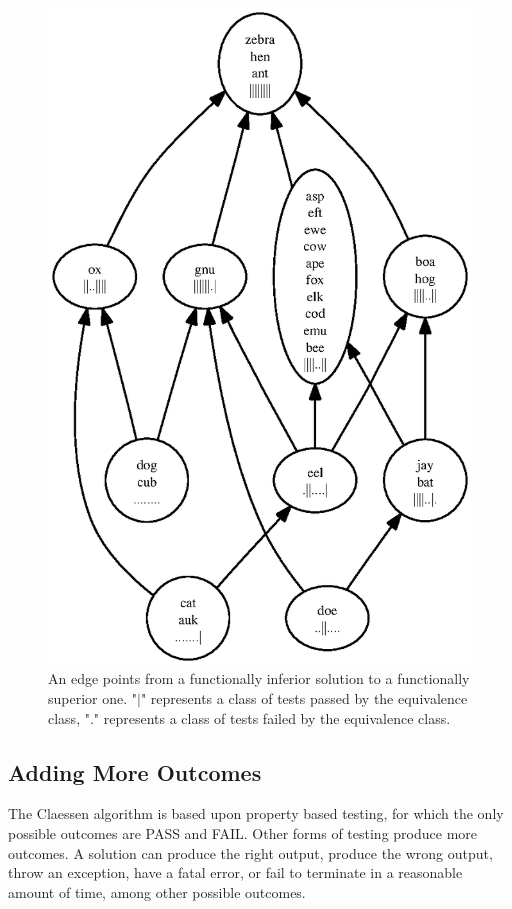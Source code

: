 \documentclass[11pt,twoside]{article}
\begin{document}
\begin{figure}
\centering
\includegraphics{rank1.ps}
\caption{An edge points from a functionally inferior solution to a functionally superior one. "$\vert$" represents a class of tests passed by the equivalence class, "." represents a class of tests failed by the equivalence class.}
\end{figure}


\subsection{Adding More Outcomes}
The Claessen algorithm is based upon property based testing, for which the only possible outcomes are PASS and FAIL. Other forms of testing produce more outcomes. A solution can produce the right output, produce the wrong output, throw an exception, have a fatal error, or fail to terminate in a reasonable amount of time, among other possible outcomes.
\end{document}
